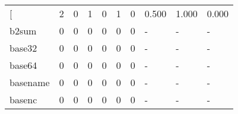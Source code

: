 \begin{longtable}{lp{2.0cm}p{2.0cm}p{2.0cm}p{2.0cm}p{2.0cm}p{2.0cm}p{2.0cm}p{2.0cm}p{2.0cm}}
\bottomrule
\endlastfoot
{[}         &                      2 &                                             0 &                                            1 &                                           0 &                                            1 &                                          0 &                                0.500 &                                  1.000 &                                0.000 \\
b2sum     &                      0 &                                             0 &                                            0 &                                           0 &                                            0 &                                          0 &                                    - &                                      - &                                    - \\
base32    &                      0 &                                             0 &                                            0 &                                           0 &                                            0 &                                          0 &                                    - &                                      - &                                    - \\
base64    &                      0 &                                             0 &                                            0 &                                           0 &                                            0 &                                          0 &                                    - &                                      - &                                    - \\
basename  &                      0 &                                             0 &                                            0 &                                           0 &                                            0 &                                          0 &                                    - &                                      - &                                    - \\
basenc    &                      0 &                                             0 &                                            0 &                                           0 &                                            0 &                                          0 &                                    - &                                      - &                                    - \\

\end{longtable}
